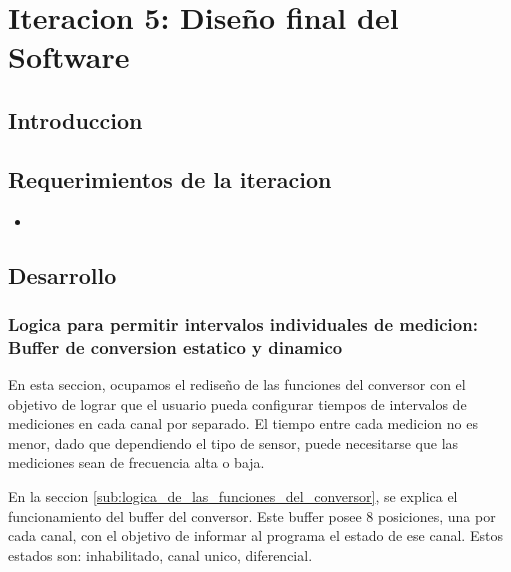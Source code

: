 \chapter{Iteracion 5: Diseño final del Software} %
\label{cha:iteracion_5}

\section{Introduccion} %
\label{sec:introduccion}


\section{Requerimientos de la iteracion} %
\label{sec:requerimientos_de_la_iteracion}

\begin{itemize}
\item
\end{itemize}



\section{Desarrollo} %
\label{sec:desarrollo}

\subsection{Logica para permitir intervalos individuales de medicion: Buffer de conversion estatico y dinamico} %
\label{sub:logica_para_permitir_intervalos_individuales_de_medicion_buffer_de_conversion_estatico_y_dinamico}

En esta seccion, ocupamos el rediseño de las funciones del conversor con el objetivo de lograr que el usuario pueda configurar tiempos de intervalos de mediciones en cada canal por separado. El tiempo entre cada medicion no es menor, dado que dependiendo el tipo de sensor, puede necesitarse que las mediciones sean de frecuencia alta o baja.

En la seccion \ref{sub:logica_de_las_funciones_del_conversor}, se explica el funcionamiento del buffer del conversor. Este buffer posee 8 posiciones, una por cada canal, con el objetivo de informar al programa el estado de ese canal. Estos estados son: inhabilitado, canal unico, diferencial.


